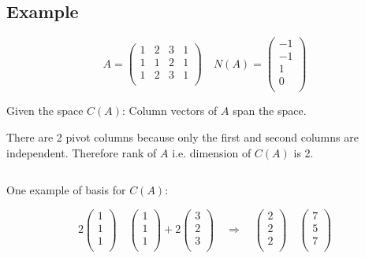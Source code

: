 \documentclass[12pt]{article}
\begin{document}
\subsection{Example}

\[
A=
\left(
    \begin{matrix}
        1 & 2 & 3 & 1\\
        1 & 1 & 2 & 1\\
        1 & 2 & 3 & 1\\
    \end{matrix}
\right)
\quad
N(A)=
\left(
    \begin{matrix}
        -1\\
        -1\\
        1\\
        0\\
    \end{matrix}
\right)
\]

Given the space $C(A)$: Column vectors of $A$ span the space.

There are 2 pivot columns because only the first and second columns are independent. Therefore rank of $A$ i.e. dimension of $C(A)$ is 2.

$\>$

One example of basis for $C(A)$:

\[
2
\left(
    \begin{matrix}
        1\\
        1\\
        1\\
    \end{matrix}
\right)
\quad
\left(
    \begin{matrix}
        1\\
        1\\
        1\\
    \end{matrix}
\right)
+2
\left(
    \begin{matrix}
        3\\
        2\\
        3\\
    \end{matrix}
\right)
\quad
\Rightarrow
\quad
\left(
    \begin{matrix}
        2\\
        2\\
        2\\
    \end{matrix}
\right)
\quad
\left(
    \begin{matrix}
        7\\
        5\\
        7\\
    \end{matrix}
\right)
\]
\end{document}
